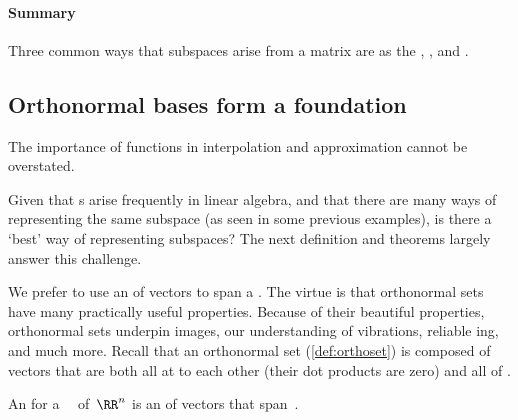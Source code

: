 \paragraph{Summary} Three common ways that subspaces arise from a matrix are as the , , and .








\subsection{Orthonormal bases form a foundation}


\begin{quoted}{\cite[\S5.3]{Cuyt2015}}
The importance of  functions in interpolation and approximation cannot be overstated.  
\end{quoted}

Given that s arise frequently in linear algebra, and that there are many ways of representing the same subspace (as seen in some previous examples), is there a `best' way of representing subspaces?
The next definition and theorems largely answer this challenge.

We prefer to use an  of vectors to span a .
The virtue is that orthonormal sets have many practically useful properties.
Because of their beautiful properties, orthonormal sets underpin \textsc{} images, our understanding of vibrations, reliable ing, and much more.
Recall that an orthonormal set (\cref{def:orthoset}) is composed of vectors that are both all at  to each other (their dot products are zero) and all of .


\begin{definition} \label{def:orthobasis} 
An  for a ~\WW\ of~\(\RR^n\) is an  of vectors that span~\WW.
\end{definition}

